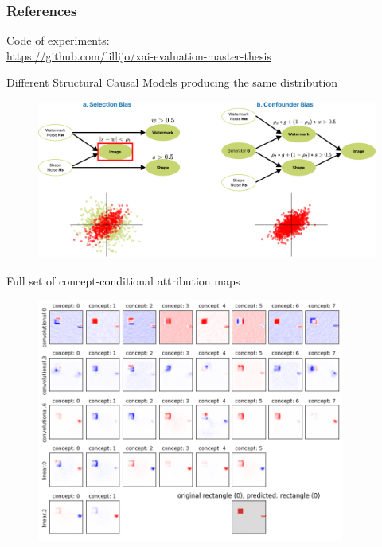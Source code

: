 \documentclass[German, aspectratio=169]{beamer}
\begin{document}
\begin{frame}
    \frametitle{References}
    \printbibliography
    Code of experiments:\\ \url{https://github.com/lillijo/xai-evaluation-master-thesis}

\end{frame}

\begin{frame}[noframenumbering]
    Different Structural Causal Models producing the same distribution
    \begin{figure}[t!]
        \centering
        \includegraphics[width=\textwidth]{images/equivalent_scm.png}
        \label{fig:equivalent_scm}
    \end{figure}
\end{frame}
\begin{frame}[noframenumbering]
    Full set of concept-conditional attribution maps
    \begin{figure}[t!]
        \centering
        \includegraphics[width=0.9\textwidth]{images/conditional_heatmaps.png}
        \label{fig:conditional_heatmaps}
    \end{figure}
\end{frame}
\end{document}
